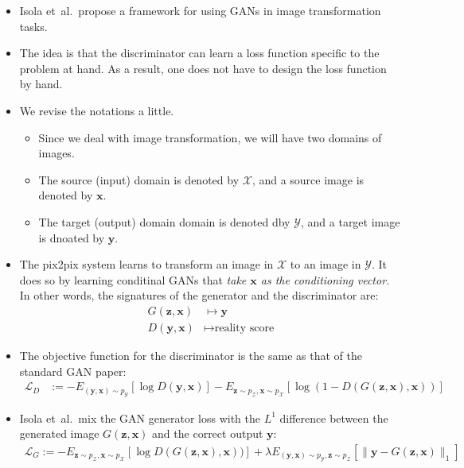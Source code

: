 \documentclass[10pt]{article}
\newcommand{\ve}[1]{\pmb{#1}}
\newcommand{\etal}{{et~al.}}
\begin{document}
  \begin{itemize}
    \item Isola \etal~propose a framework for using GANs in image transformation tasks.

    \item The idea is that the discriminator can learn a loss function specific to the problem at hand. As a result, one does not have to design the loss function by hand.

    \item We revise the notations a little. 
    \begin{itemize}
      \item Since we deal with image transformation, we will have two domains of images.

      \item The source (input) domain is denoted by $\mathcal{X}$, and a source image is denoted by $\ve{x}$.

      \item The target (output) domain domain is denoted dby $\mathcal{Y}$, and a target image is dnoated by $\ve{y}$.
    \end{itemize}

    \item The pix2pix system learns to transform an image in $\mathcal{X}$ to an image in $\mathcal{Y}$. It does so by learning conditinal GANs that \emph{take $\ve{x}$ as the conditioning vector.} In other words, the signatures of the generator and the discriminator are:
    \begin{align*}
      G(\ve{z}, \ve{x}) &\mapsto \ve{y} \\
      D(\ve{y}, \ve{x}) &\mapsto \mbox{reality score}
    \end{align*}
    \item The objective function for the discriminator is the same as that of the standard GAN paper:
    \begin{align*}
      \mathcal{L}_D 
      &:= 
      -E_{(\ve{y},\ve{x})\sim p_{\mathcal{Y}}} [\log D(\ve{y}, \ve{x})]
      -E_{\ve{z} \sim p_{\mathcal{Z}}, \ve{x} \sim p_{\mathcal{X}}}[\log (1 - D(G(\ve{z},\ve{x}), \ve{x}))]
    \end{align*}
    
    \item Isola \etal~mix the GAN generator loss with the $L^1$ difference between the generated image $G(\ve{z},\ve{x})$ and the correct output $\ve{y}$:
    \begin{align*}
      \mathcal{L}_G := -E_{\ve{z} \sim p_{\mathcal{Z}}, \ve{x} \sim p_{\mathcal{X}}}[\log  D(G(\ve{z},\ve{x}), \ve{x}))]
      + \lambda E_{(\ve{y},\ve{x})\sim p_\mathcal{Y}, \ve{z} \sim p_{\mathcal{Z}}}[ \| \ve{y} - G(\ve{z}, \ve{x}) \|_1 ]
    \end{align*}


\end{itemize}
\end{document}
